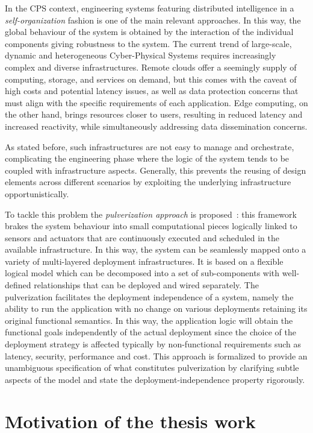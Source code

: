 In the CPS context, engineering systems featuring distributed intelligence in a \emph{self-organization} fashion is one of the main relevant
approaches. In this way, the global behaviour of the system is obtained by the interaction of the individual components giving robustness to the
system. The current trend of large-scale, dynamic and heterogeneous Cyber-Physical Systems requires increasingly complex and diverse
infrastructures. Remote clouds offer a seemingly supply of computing, storage, and services on demand, but this comes with the caveat of high
costs and potential latency issues, as well as data protection concerns that must align with the specific requirements of each application. Edge
computing, on the other hand, brings resources closer to users, resulting in reduced latency and increased reactivity, while simultaneously
addressing data dissemination concerns.

As stated before, such infrastructures are not easy to manage and orchestrate, complicating the engineering phase where the logic of the
system tends to be coupled with infrastructure aspects. Generally, this prevents the reusing of design elements across different scenarios by
exploiting the underlying infrastructure opportunistically.

To tackle this problem the \emph{pulverization approach} is proposed~\cite{fi12110203}: this framework brakes the system behaviour into small
computational pieces logically linked to sensors and actuators that are continuously executed and scheduled in the available infrastructure.
In this way, the system can be seamlessly mapped onto a variety of multi-layered deployment infrastructures.
It is based on a flexible logical model which can be decomposed into a set of sub-components with well-defined relationships that can be deployed and
wired separately. The pulverization facilitates the deployment independence of a system, namely the ability to run the application with no change
on various deployments retaining its original functional semantics.
In this way, the application logic will obtain the functional goals independently of the actual deployment since the choice of the deployment
strategy is affected typically by non-functional requirements such as latency, security, performance and cost.
This approach is formalized to provide an unambiguous specification of what constitutes pulverization by clarifying subtle aspects of the model
and state the deployment-independence property rigorously.

\section{Motivation of the thesis work}

